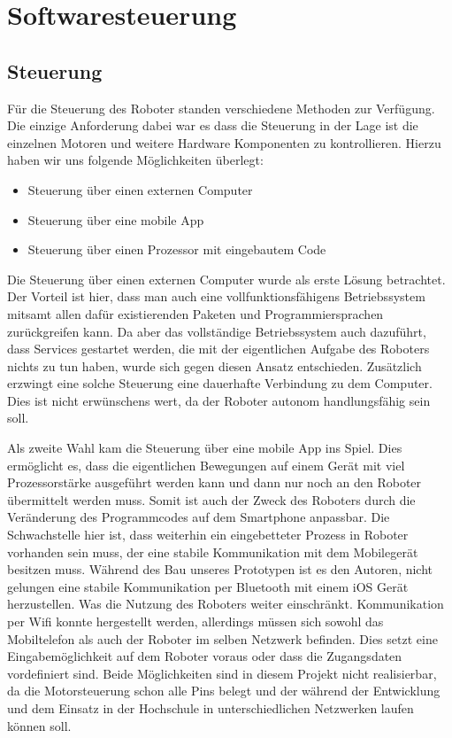 \documentclass[conference,compsoc,final,a4paper]{IEEEtran}
\begin{document}
\section{Softwaresteuerung}

\subsection{Steuerung}

Für die Steuerung des Roboter standen verschiedene Methoden zur Verfügung. Die einzige Anforderung dabei
war es dass die Steuerung in der Lage ist die einzelnen Motoren und weitere Hardware Komponenten
zu kontrollieren. Hierzu haben wir uns folgende Möglichkeiten überlegt:

\begin{itemize}
  \item Steuerung über einen externen Computer
  \item Steuerung über eine mobile App
  \item Steuerung über einen Prozessor mit eingebautem Code
\end{itemize}

Die Steuerung über einen externen Computer wurde als erste Lösung betrachtet. Der Vorteil
ist hier, dass man auch eine vollfunktionsfähigens Betriebssystem mitsamt allen dafür existierenden
Paketen und Programmiersprachen zurückgreifen kann. Da aber das vollständige Betriebssystem auch
dazuführt, dass Services gestartet werden, die mit der eigentlichen Aufgabe des Roboters nichts zu
tun haben, wurde sich gegen diesen Ansatz entschieden. Zusätzlich erzwingt eine solche Steuerung
eine dauerhafte Verbindung zu dem Computer. Dies ist nicht erwünschens wert, da der Roboter autonom
handlungsfähig sein soll.

Als zweite Wahl kam die Steuerung über eine mobile App ins Spiel. Dies ermöglicht es, dass die
eigentlichen Bewegungen auf einem Gerät mit viel Prozessorstärke ausgeführt werden kann und dann nur
noch an den Roboter übermittelt werden muss. Somit ist auch der Zweck des Roboters
durch die Veränderung des Programmcodes auf dem Smartphone anpassbar. Die Schwachstelle hier ist,
dass weiterhin ein eingebetteter Prozess in Roboter vorhanden sein muss, der eine stabile
Kommunikation mit dem Mobilegerät besitzen muss. Während des Bau unseres Prototypen ist es den Autoren,
nicht gelungen eine stabile Kommunikation per Bluetooth mit einem iOS Gerät herzustellen.
Was die Nutzung des Roboters weiter einschränkt. Kommunikation per Wifi konnte hergestellt werden,
allerdings müssen sich sowohl das Mobiltelefon als auch der Roboter im 
selben Netzwerk befinden. Dies setzt eine Eingabemöglichkeit auf dem Roboter voraus oder dass
die Zugangsdaten vordefiniert sind. Beide Möglichkeiten sind in diesem Projekt nicht realisierbar,
da die Motorsteuerung schon alle Pins belegt und der während der Entwicklung und dem Einsatz in der
Hochschule in unterschiedlichen Netzwerken laufen können soll.
\end{document}

